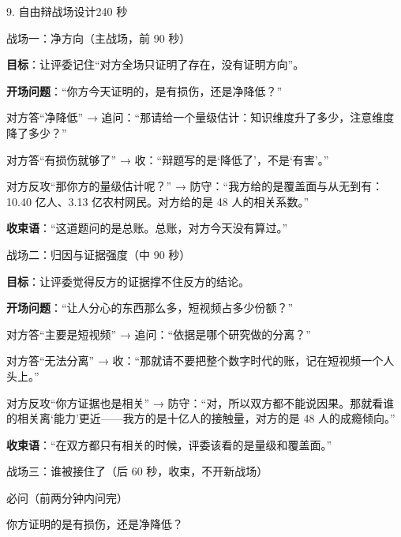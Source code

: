 \documentclass[script,pro]{debate}
\begin{document}
\begin{stage}{9. 自由辩战场设计}{240 秒}
\begin{battleground}{战场一：净方向（主战场，前 90 秒）}
\begin{bullets}
\item \textbf{目标}：让评委记住“对方全场只证明了存在，没有证明方向”。
\item \textbf{开场问题}：“你方今天证明的，是有损伤，还是净降低？”
\item 对方答“净降低” → 追问：“那请给一个量级估计：知识维度升了多少，注意维度降了多少？”
\item 对方答“有损伤就够了” → 收：“辩题写的是‘降低了’，不是‘有害’。”
\item 对方反攻“那你方的量级估计呢？” → 防守：“我方给的是覆盖面与从无到有：10.40 亿人、3.13 亿农村网民。对方给的是 48 人的相关系数。”
\item \textbf{收束语}：“这道题问的是总账。总账，对方今天没有算过。”
\end{bullets}
\end{battleground}
\begin{battleground}{战场二：归因与证据强度（中 90 秒）}
\begin{bullets}
\item \textbf{目标}：让评委觉得反方的证据撑不住反方的结论。
\item \textbf{开场问题}：“让人分心的东西那么多，短视频占多少份额？”
\item 对方答“主要是短视频” → 追问：“依据是哪个研究做的分离？”
\item 对方答“无法分离” → 收：“那就请不要把整个数字时代的账，记在短视频一个人头上。”
\item 对方反攻“你方证据也是相关” → 防守：“对，所以双方都不能说因果。那就看谁的相关离‘能力’更近——我方的是十亿人的接触量，对方的是 48 人的成瘾倾向。”
\item \textbf{收束语}：“在双方都只有相关的时候，评委该看的是量级和覆盖面。”
\end{bullets}
\end{battleground}
\begin{battleground}{战场三：谁被接住了（后 60 秒，收束，不开新战场）}
\begin{fields}
\end{fields}
\begin{points}{必问（前两分钟内问完）}
\item 你方证明的是有损伤，还是净降低？

\end{points}
\end{battleground}
\end{stage}
\end{document}
